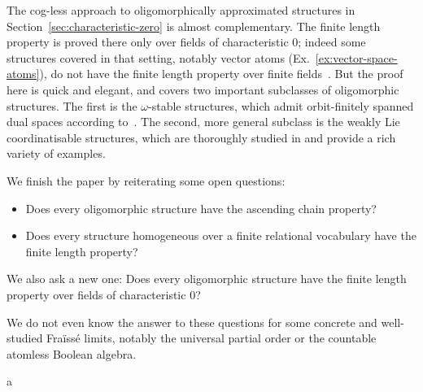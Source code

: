 The cog-less approach to oligomorphically approximated structures in Section~\ref{sec:characteristic-zero} is almost complementary.
The finite length property is proved there only over fields of characteristic $0$; indeed some structures covered in that setting, notably vector atoms (Ex.~\ref{ex:vector-space-atoms}), do not have the finite length property over finite fields~\cite[Sec.~4.4]{BFKM24}.
But the proof here is quick and elegant, and covers two important subclasses of oligomorphic structures. 
The first is the $\omega$-stable structures, which admit orbit-finitely spanned dual spaces according to~\cite[Thm.~3.7]{Przybylek_2024}.
The second, more general subclass is the weakly Lie coordinatisable structures, which are thoroughly studied in \cite{CherlinHrushovski_03} and provide a rich variety of examples.

We finish the paper by reiterating some open questions:
\begin{itemize}
\item \cite[Q.~2]{CaminaEvans_91} Does every oligomorphic structure have the ascending chain property? 
\item \cite[Q.~1.4]{Evans_pm1} Does every structure homogeneous over a finite relational vocabulary have the finite length property?
\end{itemize}

We also  ask a new one: Does every oligomorphic structure have the finite length property over fields of characteristic $0$?

We do not even know the answer to these questions for some concrete and well-studied Fraïssé limits, notably the universal partial order or the countable atomless Boolean algebra.

a \cite{vanthé2013kechrispestovtodorceviccorrespondenceprecompactexpansions}